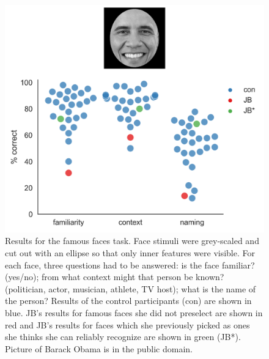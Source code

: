 \documentclass[fleqn,10pt]{SelfArx} %
\begin{document}
\begin{figure}[htbp]
	
	\renewcommand{\familydefault}{\sfdefault}\normalfont
	\centering
	\includegraphics[width=\columnwidth]{../reports/figures/famface_main_figure.png}
	\vspace*{-3mm}
	\caption{Results for the famous faces task. Face stimuli were grey-scaled and cut out with an ellipse so that only inner features were visible. For each face, three questions had to be answered: is the face familiar? (yes/no); from what context might that person be known? (politician, actor, musician, athlete, TV host); what is the name of the person? Results of the control participants (con) are shown in blue. JB's results for famous faces she did not preselect are shown in red and JB's results for faces which she previously picked as ones she thinks she can reliably recognize are shown in green (JB*). Picture of Barack Obama is in the public domain.}%
	\label{fig:famous}
	
\end{figure}
\end{document}
